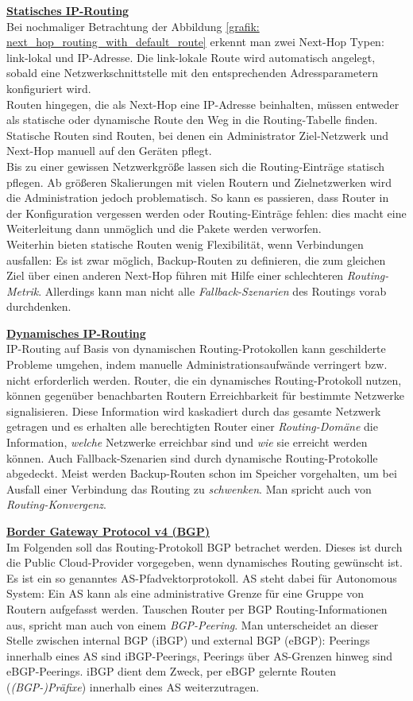 \textbf{\underline{Statisches IP-Routing}}\\
Bei nochmaliger Betrachtung der Abbildung \ref{grafik: next_hop_routing_with_default_route} erkennt man zwei Next-Hop Typen: link-lokal und \glqq IP-Adresse\grqq{}. Die link-lokale Route wird automatisch angelegt, sobald eine Netzwerkschnittstelle mit den entsprechenden Adressparametern konfiguriert wird.\\
Routen hingegen, die als Next-Hop eine IP-Adresse beinhalten, müssen entweder als statische oder dynamische Route den Weg in die Routing-Tabelle finden. Statische Routen sind Routen, bei denen ein Administrator Ziel-Netzwerk und Next-Hop manuell auf den Geräten pflegt.\\
Bis zu einer gewissen Netzwerkgröße lassen sich die Routing-Einträge statisch pflegen. Ab größeren Skalierungen mit vielen Routern und Zielnetzwerken wird die Administration jedoch problematisch. So kann es passieren, dass Router in der Konfiguration vergessen werden oder Routing-Einträge fehlen: dies macht eine Weiterleitung dann unmöglich und die Pakete werden verworfen.\\
Weiterhin bieten statische Routen wenig Flexibilität, wenn Verbindungen ausfallen: Es ist zwar möglich, Backup-Routen zu definieren, die zum gleichen Ziel über einen anderen Next-Hop führen mit Hilfe einer schlechteren \textit{Routing-Metrik}. Allerdings kann man nicht alle \textit{Fallback-Szenarien} des Routings vorab durchdenken.

\textbf{\underline{Dynamisches IP-Routing}}\\
IP-Routing auf Basis von dynamischen Routing-Protokollen kann geschilderte Probleme umgehen, indem manuelle Administrationsaufwände verringert bzw. nicht erforderlich werden. Router, die ein dynamisches Routing-Protokoll nutzen, können gegenüber benachbarten Routern Erreichbarkeit für bestimmte Netzwerke signalisieren. Diese Information wird kaskadiert durch das gesamte Netzwerk getragen und es erhalten alle berechtigten Router einer \textit{Routing-Domäne} die Information, \textit{welche} Netzwerke erreichbar sind und \textit{wie} sie erreicht werden können. Auch Fallback-Szenarien sind durch dynamische Routing-Protokolle abgedeckt. Meist werden Backup-Routen schon im Speicher vorgehalten, um bei Ausfall einer Verbindung das Routing zu \textit{schwenken}. Man spricht auch von \textit{Routing-Konvergenz}.

\textbf{\underline{Border Gateway Protocol v4 (BGP)}}\\
Im Folgenden soll das Routing-Protokoll BGP betrachet werden. Dieses ist durch die Public Cloud-Provider vorgegeben, wenn dynamisches Routing gewünscht ist. Es ist ein so genanntes AS-Pfadvektorprotokoll. AS steht dabei für Autonomous System: Ein AS kann als eine administrative \glqq Grenze\grqq{} für eine Gruppe von Routern aufgefasst werden. Tauschen Router per BGP Routing-Informationen aus, spricht man auch von einem \textit{BGP-Peering}. Man unterscheidet an dieser Stelle zwischen internal BGP (iBGP) und external BGP (eBGP): Peerings innerhalb eines AS sind iBGP-Peerings, Peerings über AS-Grenzen hinweg sind eBGP-Peerings. iBGP dient dem Zweck, per eBGP gelernte Routen (\textit{(BGP-)Präfixe}) innerhalb eines AS weiterzutragen.

